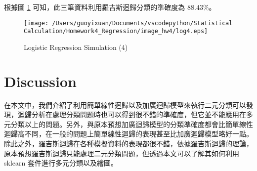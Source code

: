 根據圖 \ref{fig:log4} 可知，此三筆資料利用羅吉斯迴歸分類的準確度為 $88.43\%$。 
            
\begin{figure}[H]
    \centering
        \texttt{[image: /Users/guoyixuan/Documents/vscodepython/Statistical Calculation/Homework4\_Regression/image\_hw4/log4.eps]}
    \caption{Logistic Regression Simulation (4)}
    \label{fig:log4}
\end{figure}

\section{Discussion}

在本文中，我們介紹了利用簡單線性迴歸以及加廣迴歸模型來執行二元分類可以發現，迴歸分析在處理分類問題時也可以得到很不錯的準確度，但它並不能應用在多元分類以上的問題。另外，與原本預想加廣迴歸模型的分類準確度都會比簡單線性迴歸高不同，在一般的問題上簡單線性迴歸的表現甚至比加廣迴歸模型略好一點。除此之外，羅吉斯迴歸在各種模擬資料的表現都很不錯，依據羅吉斯迴歸的理論，原本預想羅吉斯迴歸只能處理二元分類問題，但透過本文可以了解其如何利用 sklearn 套件進行多元分類以及繪圖。


